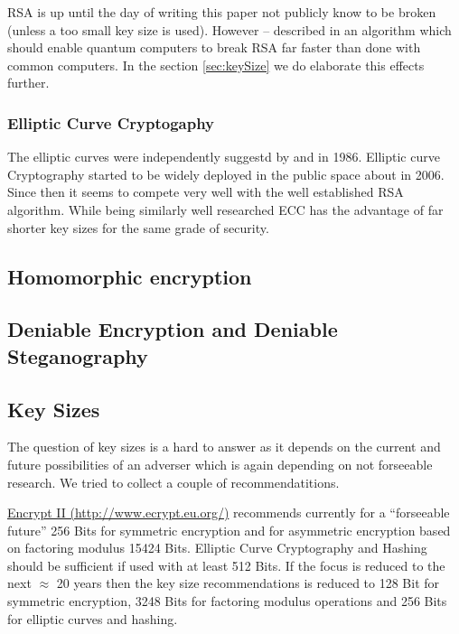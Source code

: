 RSA is up until the day of writing this paper not publicly know to be broken (unless a too small key size is used). However -- \citeauthor{Shor97polynomial-timealgorithms} described in \citeyear{Shor97polynomial-timealgorithms} an algorithm which should enable quantum computers to break RSA far faster than done with common computers. In the section \ref{sec:keySize} we do elaborate this effects further.

\subsubsection{Elliptic Curve Cryptogaphy}
The elliptic curves were independently suggestd by \cite{Miller1986} and \cite{Koblitz04guideto} in 1986. Elliptic curve Cryptography started to be widely deployed in the public space about in 2006. Since then it seems to compete very well with the well established RSA algorithm. While being similarly well researched ECC has the advantage of far shorter key sizes for the same grade of security.

\subsection{Homomorphic encryption}

\subsection{Deniable Encryption and Deniable Steganography}

\subsection{Key Sizes\label{sec:keySize}}
The question of key sizes is a hard to answer as it depends on the current and future possibilities of an adverser which is again depending on not forseeable research. We tried to collect a couple of recommendatitions.

\href{http://www.ecrypt.eu.org/}{Encrypt II (http://www.ecrypt.eu.org/)} recommends currently for a ``forseeable future'' 256 Bits for symmetric encryption and for asymmetric encryption based on factoring modulus 15424 Bits. Elliptic Curve Cryptography and Hashing should be sufficient if used with at least 512 Bits. If the focus is reduced to the next $\approx$ 20 years then the key size recommendations is reduced to 128 Bit for symmetric encryption, 3248 Bits for factoring modulus operations and 256 Bits for elliptic curves and hashing.

